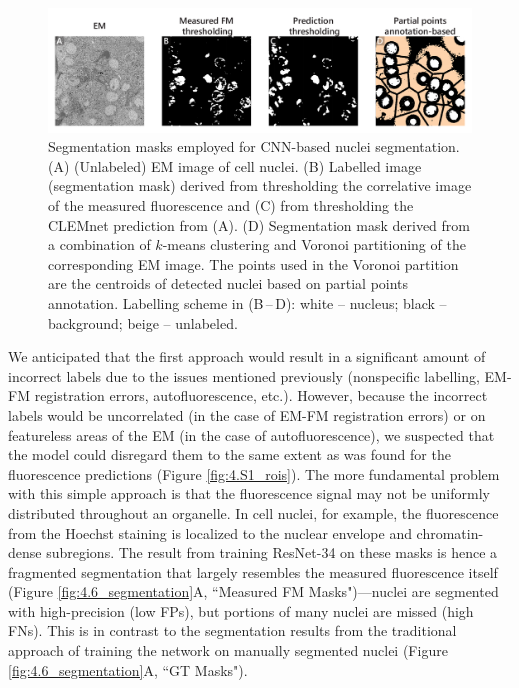 \begin{figure}[!tb]
    \centering
    \includegraphics[width=\linewidth]{chapter-4/figures_PDF/fig4-5_masks.pdf}
    \caption{Segmentation masks employed for CNN-based nuclei segmentation.
    (A) (Unlabeled) EM image of cell nuclei.
    (B) Labelled image (segmentation mask) derived from thresholding the correlative image of the measured fluorescence and (C) from thresholding the CLEMnet prediction from (A).
    (D) Segmentation mask derived from a combination of $k$-means clustering and Voronoi partitioning of the corresponding EM image. The points used in the Voronoi partition are the centroids of detected nuclei based on partial points annotation. Labelling scheme in (B\,--\,D): white -- nucleus; black -- background; beige -- unlabeled.}
    \label{fig:4.5_masks}
\end{figure}

We anticipated that the first approach would result in a significant amount of incorrect labels due to the issues mentioned previously (nonspecific labelling, EM-FM registration errors, autofluorescence, etc.). However, because the incorrect labels would be uncorrelated (in the case of EM-FM registration errors) or on featureless areas of the EM (in the case of autofluorescence), we suspected that the model could disregard them to the same extent as was found for the fluorescence predictions (Figure \ref{fig:4.S1_rois}). The more fundamental problem with this simple approach is that the fluorescence signal may not be uniformly distributed throughout an organelle. In cell nuclei, for example, the fluorescence from the Hoechst staining is localized to the nuclear envelope and chromatin-dense subregions. The result from training ResNet-34 on these masks is hence a fragmented segmentation that largely resembles the measured fluorescence itself (Figure \ref{fig:4.6_segmentation}A, ``Measured FM Masks")---nuclei are segmented with high-precision (low FPs), but portions of many nuclei are missed (high FNs). This is in contrast to the segmentation results from the traditional approach of training the network on manually segmented nuclei (Figure \ref{fig:4.6_segmentation}A, ``GT Masks").

